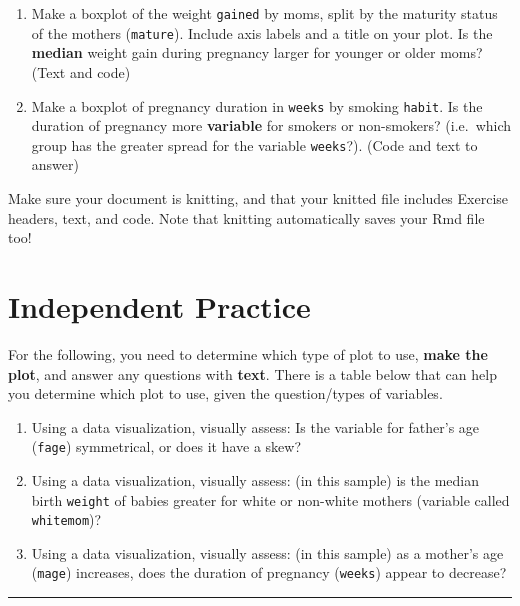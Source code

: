 \documentclass[]{article}
\begin{document}
\begin{enumerate}
\def\labelenumi{\arabic{enumi}.}
\setcounter{enumi}{7}
\item
  Make a boxplot of the weight \texttt{gained} by moms, split by the
  maturity status of the mothers (\texttt{mature}). Include axis labels
  and a title on your plot. Is the \textbf{median} weight gain during
  pregnancy larger for younger or older moms? (Text and code)
\item
  Make a boxplot of pregnancy duration in \texttt{weeks} by smoking
  \texttt{habit}. Is the duration of pregnancy more \textbf{variable}
  for smokers or non-smokers? (i.e.~which group has the greater spread
  for the variable \texttt{weeks}?). (Code and text to answer)
\end{enumerate}

\leavevmode\hypertarget{license}{}%
Make sure your document is knitting, and that your knitted file includes
Exercise headers, text, and code. Note that knitting automatically saves
your Rmd file too!

\hypertarget{independent-practice}{%
\section{Independent Practice}\label{independent-practice}}

For the following, you need to determine which type of plot to use,
\textbf{make the plot}, and answer any questions with \textbf{text}.
There is a table below that can help you determine which plot to use,
given the question/types of variables.

\begin{enumerate}
\def\labelenumi{\arabic{enumi}.}
\item
  Using a data visualization, visually assess: Is the variable for
  father's age (\texttt{fage}) symmetrical, or does it have a skew?
\item
  Using a data visualization, visually assess: (in this sample) is the
  median birth \texttt{weight} of babies greater for white or non-white
  mothers (variable called \texttt{whitemom})?
\item
  Using a data visualization, visually assess: (in this sample) as a
  mother's age (\texttt{mage}) increases, does the duration of pregnancy
  (\texttt{weeks}) appear to decrease?
\end{enumerate}

\begin{center}\rule{0.5\linewidth}{0.5pt}\end{center}
\end{document}
